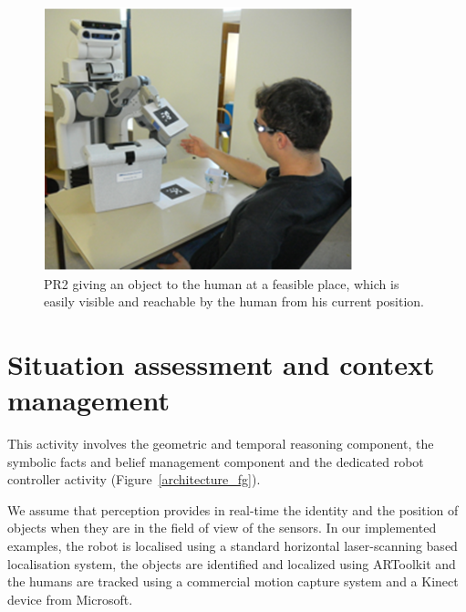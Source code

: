 \documentclass{svmult}
\begin{document}
\begin{figure}
  \centering
  \includegraphics[width=0.8\textwidth]{./figs/mightabilities/5.png}
  \caption { 
PR2 giving an object to the human at a feasible place, which is easily visible
and reachable by the human from his current position.
}
  \label{fig|pr2-giving}
\end{figure}



\section{Situation assessment and context management}
\label{sec:situ}


This activity involves the geometric and temporal reasoning component,
the symbolic facts and belief management component and the dedicated
robot controller activity (Figure~\ref{architecture_fg}).

We assume that perception provides in real-time the identity and the
position of objects when they are in the field of view of the sensors.
In our implemented examples, the robot is localised using a standard
horizontal laser-scanning based localisation system, the objects are
identified and localized using ARToolkit \cite{ARToolkit} and the
humans are tracked using a commercial motion capture system and a
Kinect device from Microsoft.
\end{document}
